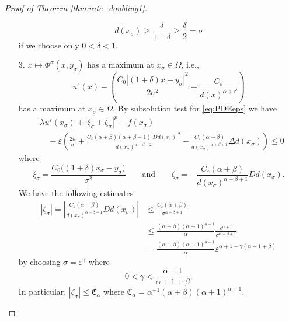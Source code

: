 \documentclass[11pt,reqno]{amsart}
\numberwithin{figure}{section}
\theoremstyle{plain}
\theoremstyle{remark}
\numberwithin{equation}{section}
\begin{document}
\begin{proof}[Proof of Theorem \ref{thm:rate_doubling1}]
\begin{enumerate}
    \begin{equation}\label{e:snow_7}
    d(x_\sigma)\geq \frac{\delta}{1+\delta} \geq \frac{\delta}{2} = \sigma
    \end{equation}
    if we choose only $0<\delta < 1$.
    \item[3.] $x\mapsto \Phi^\sigma(x,y_\sigma)$ has a maximum at $x_\sigma\in \Omega$, i.e.,
    \begin{equation*}
        u^\varepsilon(x) - \left(\frac{C_0|(1+\delta)x-y_\sigma|^2}{2\sigma^2} + \frac{C_\varepsilon}{d(x)^{\alpha+\beta}}\right)
    \end{equation*}
    has a maximum at $x_\sigma\in \Omega$. By subsolution test for \eqref{eq:PDEeps} we have
\begin{align}\label{e:sub1}
    &\lambda u^\varepsilon(x_\sigma) + \left|\xi_\sigma+\zeta_\sigma\right|^p - f(x_\sigma)\nonumber\\
    &\quad  -\varepsilon\left(\frac{2n}{\sigma} + \frac{C_\varepsilon(\alpha+\beta)(\alpha+\beta+1)|D d(x_\sigma)|^2}{d(x_\sigma)^{\alpha+\beta+2}}-\frac{C_\varepsilon(\alpha+\beta)}{d(x_\sigma)^{\alpha+\beta+1}}\Delta d(x_\sigma)\right)  \leq 0
\end{align}
where 
\begin{equation}\label{e:est_xi_zeta}
    \xi_\sigma = \frac{C_0\big((1+\delta)x_\sigma-y_\sigma\big)}{\sigma^2} \qquad\text{and}\qquad \zeta_\sigma = - \frac{C_\varepsilon(\alpha+\beta)}{d(x_\sigma)^{\alpha+\beta+1}}D d(x_\sigma).
\end{equation}
We have the following estimates
\begin{align*}
    |\zeta_\sigma|=\left|\frac{C_\varepsilon(\alpha+\beta)}{d(x_\sigma)^{\alpha+\beta+1}}D d(x_\sigma )\right|
    &\leq \frac{C_\varepsilon(\alpha+\beta)}{\sigma^{\alpha+\beta+1}} \\
    &\leq \frac{(\alpha+\beta)(\alpha+1)^{\alpha+1}}{\alpha} \frac{\varepsilon^{\alpha+1}}{\sigma^{\alpha+\beta+1}} \\
    &= \frac{(\alpha+\beta)(\alpha+1)^{\alpha+1}}{\alpha}\varepsilon^{\alpha+1 - \gamma(\alpha+1+\beta)}
\end{align*}
by choosing $\sigma = \varepsilon^\gamma$ where
\begin{equation*}
 \displaystyle 0 < \gamma < \frac{\alpha+1}{\alpha+1+\beta}.
\end{equation*}
In particular, $|\zeta_\sigma|\leq \mathfrak{C}_\alpha$ where $\mathfrak{C}_\alpha = \alpha^{-1}(\alpha+\beta)(\alpha+1)^{\alpha+1}$. 


\end{enumerate}
\end{proof}
\end{document}
